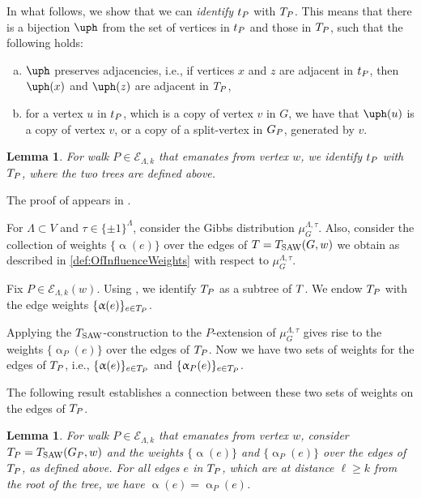 \documentclass[11pt,reqno]{amsart}
\numberwithin{equation}{section}
\newtheorem{lemma}[theorem]{Lemma}
\newcommand{\cE}{{\mathcal{E}}}
\newcommand{\applegreen}[1]{ {\color{applegreen}#1}}
\newcommand{\blue}[1]{{\color{blue}#1}}
\newcommand{\bluepigment}[1]{{\color{blue(pigment)}#1}}
\newcommand{\cadmiumgreen}[1]{{\color{cadmiumgreen}#1}}
\newcommand{\electricviolet}[1]{{\color{electricviolet}#1}}
\newcommand{\goldenbrown}[1]{{\color{goldenbrown}#1}}
\newcommand{\heliotrope}[1]{{\color{heliotrope}#1}}
\newcommand{\iris}[1]{{\color{iris}#1}}
\newcommand{\red}[1]{{\color{red}#1}}
\newcommand{\ExtV}{\iris{\cE}}
\newcommand{\Tsaw}{T_{\rm SAW}}
\renewcommand{\applegreen}[1]{#1}
\renewcommand{\blue}[1]{#1}
\renewcommand{\bluepigment}[1]{#1}
\renewcommand{\cadmiumgreen}[1]{#1}
\renewcommand{\electricviolet}[1]{#1}
\renewcommand{\goldenbrown}[1]{#1}
\renewcommand{\heliotrope}[1]{#1}
\renewcommand{\iris}[1]{#1}
\renewcommand{\red}[1]{#1}
\newcommand{\ke}{\blue{e}}
\newcommand{\kk}{\bluepigment{k}}
\newcommand{\kell}{{\color{green(pigment)}\ell}}%
\newcommand{\kP}{\goldenbrown{P}}
\newcommand{\ku}{\red{u}}
\newcommand{\kv}{\electricviolet{v}}
\newcommand{\kw}{\blue{w}}
\newcommand{\kx}{\heliotrope{x}}
\newcommand{\kz}{\cadmiumgreen{z}}
\renewcommand{\ke}{e}
\renewcommand{\kk}{k}
\renewcommand{\kell}{\ell}
\renewcommand{\kP}{P}
\renewcommand{\ku}{u}
\renewcommand{\kv}{v}
\renewcommand{\kw}{w}
\renewcommand{\kx}{x}
\renewcommand{\kz}{z}
\newcommand{\infweight}{\upalpha}
\begin{document}
In what follows, we show that we can {\em identify} $\STw_{\kP}$ with $\XTPw$. This means that there is 
 a bijection ${\uph}$ from the set of vertices in $\STw_{\kP}$ and those in $\XTPw$,
%
such that the following holds:
\begin{enumerate}[(a)]
\item  $\uph$ preserves adjacencies, i.e., if vertices $\kx$ and $\kz$ are adjacent in $\STw_{\kP}$, then $\uph(\kx)$ and $\uph(\kz)$ are adjacent in $\XTPw$,
\item for a vertex $\ku$ in $\STw_{\kP}$, which is a copy of vertex $\kv$ in $G$, we have that $\uph(\ku)$ is a copy of vertex $\kv$, or a 
copy of a split-vertex in $\gext{G}{\kP}$, generated by $\kv$. 
\end{enumerate}


\begin{lemma}\label{lemma:TsawPVsTsaw}
For walk $\kP\in \ExtV_{\Lambda,\kk}$ that emanates from vertex $\kw$, we  identify $\STw_{\kP}$ with $\XTPw$, where the two trees are defined above.
\end{lemma}



The proof of  appears in .



For $\Lambda\subset V$ and $\tau\in \{\pm 1\}^{\Lambda}$, consider the Gibbs distribution $\mu^{\Lambda,\tau}_G$. 
Also, consider the collection of weights $\{ \infweight(e)\}$ over the edges of $\Tw=\Tsaw(G,\kw)$ we obtain as described 
in \eqref{def:OfInfluenceWeights} with respect to $\mu^{\Lambda,\tau}_G$. 


Fix $\kP\in \ExtV_{\Lambda,k}(w)$. Using ,  we identify $\XTPw$ as a subtree of $T$. 
We endow $\XTPw$ with the edge weights $\{\infweight(e)\}_{e\in \XTPw}$. 


Applying the $\Tsaw$-construction to the $\kP$-extension of $\mu^{\Lambda,\tau}_G$ gives rise to the weights $\{\infweight_{\kP} (e)\}$ 
over the edges of $\XTPw$. Now we have two sets of weights for the edges of $\XTPw$, i.e., $\{\infweight(e)\}_{e\in \XTPw}$ and 
$\{\infweight_{\kP}(e)\}_{e\in \XTPw}$. 


The following result establishes a connection between these two sets of weights on the edges of $\XTPw$.

 
\begin{lemma}\label{lemma:GibbsWeightsTpVsP}
For walk $\kP\in \ExtV_{\Lambda,\kk}$ that emanates from vertex $\kw$, consider $\XTPw=\Tsaw(\gext{G}{\kP},w)$ and the weights $\{ \infweight(e)\}$ and $\{\infweight_{\kP}(e)\}$ 
over the edges of $\XTPw$, as defined above.
For all edges $\ke$ in $\XTPw$, which are at distance $\kell \geq \kk$ from the root of the tree, we have 
$\infweight(\ke)=\infweight_{\kP}(\ke)$. 
\end{lemma}
\end{document}
